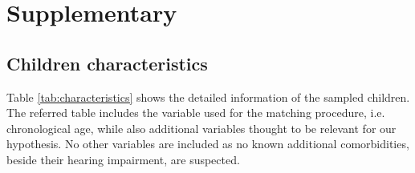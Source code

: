 \section{Supplementary}
%
\subsection{Children characteristics} \label{sSA:characteristics}
%
Table \ref{tab:characteristics} shows the detailed information of the sampled children. The referred table includes the variable used for the matching procedure, i.e. chronological age, while also additional variables thought to be relevant for our hypothesis. No other variables are included as no known additional comorbidities, beside their hearing impairment, are suspected.
%
